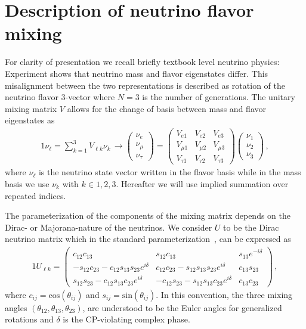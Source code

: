 \documentclass[addchapnum]{ws-rv961x669} %
\begin{document}
\section{Description of neutrino flavor mixing}
\label{sec:numass}
For clarity of presentation we recall briefly textbook level neutrino physics: Experiment shows that neutrino mass and flavor eigenstates differ. This misalignment between the two representations is described as rotation of the neutrino flavor 3-vector where $N=3$ is the number of generations. The unitary mixing matrix $V$ allows for the change of basis between mass and flavor eigenstates as 
\begin{alignat}{1}
	\label{basis:1} \nu_{\ell}=\sum_{k=1}^{3}V_{\ell k}\nu_{k}\,\rightarrow
	\begin{pmatrix}
		\nu_{e}\\
		\nu_{\mu}\\
		\nu_{\tau}
	\end{pmatrix}=
	\begin{pmatrix}
		V_{e1} & V_{e2} & V_{e3}\\
		V_{\mu1} & V_{\mu2} & V_{\mu3}\\
		V_{\tau1} & V_{\tau2} & V_{\tau3}
	\end{pmatrix}
	\begin{pmatrix}
		\nu_{1}\\
		\nu_{2}\\
		\nu_{3}
	\end{pmatrix}\,,
\end{alignat}
where $\nu_{\ell}$ is the neutrino state vector written in the flavor basis while in the mass basis we use $\nu_{k}$ with $k\in1,2,3$. Hereafter we will use implied summation  over repeated indices.

The parameterization of the components of the mixing matrix depends on the Dirac- or Majorana-nature of the neutrinos. We consider $U$ to be the Dirac neutrino matrix which in the standard parameterization~\citep{Schwartz:2014sze}, can be expressed as
\begin{alignat}{1}
	\label{rotation:1} U_{\ell k} =
	  \begin{pmatrix}
		  c_{12}c_{13} & s_{12}c_{13} & s_{13}e^{-i\delta}\\
		  -s_{12}c_{23} - c_{12}s_{13}s_{23}e^{i\delta} & c_{12}c_{23} - s_{12}s_{13}s_{23}e^{i\delta} & c_{13}s_{23}\\
		  s_{12}s_{23} - c_{12}s_{13}c_{23}e^{i\delta}& -c_{12}s_{23} - s_{12}s_{13}c_{23}e^{i\delta} & c_{13}c_{23}
	  \end{pmatrix}\,,
\end{alignat}
where $c_{ij} = \mathrm{cos}(\theta_{ij})$ and $s_{ij} = \mathrm{sin}(\theta_{ij})$. In this convention, the three mixing angles $(\theta_{12}, \theta_{13}, \theta_{23})$, are understood to be the Euler angles for generalized rotations and $\delta$ is the CP-violating complex phase. 
\end{document}
